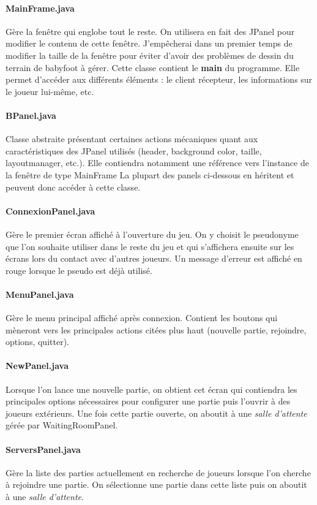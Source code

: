 \documentclass[a4paper,12pt]{report}
\begin{document}
\paragraph{MainFrame.java}
Gère la fenêtre qui englobe tout le reste. On utilisera en fait des JPanel pour modifier le contenu de cette fenêtre. J'empêcherai dans un premier temps de modifier la taille de la fenêtre pour éviter d'avoir des problèmes de dessin du terrain de babyfoot à gérer. Cette classe contient le \textbf{main} du programme. Elle permet d'accéder aux différents éléments : le client récepteur, les informations sur le joueur lui-même, etc.
\paragraph{BPanel.java}
Classe abstraite présentant certaines actions mécaniques quant aux caractéristiques des JPanel utilisés (header, background color, taille, layoutmanager, etc.). Elle contiendra notamment une référence vers l'instance de la fenêtre de type MainFrame La plupart des panels ci-dessous en héritent et peuvent donc accéder à cette classe.
\paragraph{ConnexionPanel.java}
Gère le premier écran affiché à l'ouverture du jeu. On y choisit le pseudonyme que l'on souhaite utiliser dans le reste du jeu et qui s'affichera ensuite sur les écrans lors du contact avec d'autres joueurs. Un message d'erreur est affiché en rouge lorsque le pseudo est déjà utilisé.
\paragraph{MenuPanel.java}
Gère le menu principal affiché après connexion. Contient les boutons qui mèneront vers les principales actions citées plus haut (nouvelle partie, rejoindre, options, quitter).
\paragraph{NewPanel.java}
Lorsque l'on lance une nouvelle partie, on obtient cet écran qui contiendra les principales options nécessaires pour configurer une partie puis l'ouvrir à des joueurs extérieurs. Une fois cette partie ouverte, on aboutit à une \emph{salle d'attente} gérée par WaitingRoomPanel.
\paragraph{ServersPanel.java}
Gère la liste des parties actuellement en recherche de joueurs lorsque l'on cherche à rejoindre une partie. On sélectionne une partie dans cette liste puis on aboutit à une \emph{salle d'attente}.
\end{document}
